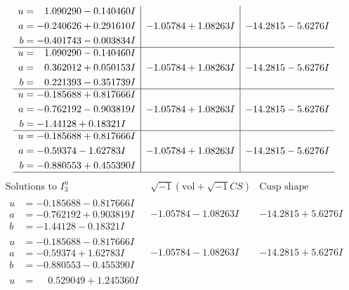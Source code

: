 \documentclass[1p]{elsarticle_modified}
\theoremstyle{definition}
\newcommand{\I}{\sqrt{-1}}
\begin{document}
$$\begin{array}{c|c|c}
\begin{aligned}
u &= \phantom{-}1.090290 - 0.140460 I \\
a &= -0.240626 + 0.291610 I \\
b &= -0.401743 - 0.003834 I\end{aligned}
 & -1.05784 + 1.08263 I & -14.2815 - 5.6276 I \\ \hline\begin{aligned}
u &= \phantom{-}1.090290 - 0.140460 I \\
a &= \phantom{-}0.362012 + 0.050153 I \\
b &= \phantom{-}0.221393 - 0.351739 I\end{aligned}
 & -1.05784 + 1.08263 I & -14.2815 - 5.6276 I \\ \hline\begin{aligned}
u &= -0.185688 + 0.817666 I \\
a &= -0.762192 - 0.903819 I \\
b &= -1.44128 + 0.18321 I\end{aligned}
 & -1.05784 + 1.08263 I & -14.2815 - 5.6276 I \\ \hline\begin{aligned}
u &= -0.185688 + 0.817666 I \\
a &= -0.59374 - 1.62783 I \\
b &= -0.880553 + 0.455390 I\end{aligned}
 & -1.05784 + 1.08263 I & -14.2815 - 5.6276 I\\
 \hline 
 \end{array}$$\newpage$$\begin{array}{c|c|c}  
\text{Solutions to }I^u_{3}& \I (\text{vol} + \sqrt{-1}CS) & \text{Cusp shape}\\
 \hline 
\begin{aligned}
u &= -0.185688 - 0.817666 I \\
a &= -0.762192 + 0.903819 I \\
b &= -1.44128 - 0.18321 I\end{aligned}
 & -1.05784 - 1.08263 I & -14.2815 + 5.6276 I \\ \hline\begin{aligned}
u &= -0.185688 - 0.817666 I \\
a &= -0.59374 + 1.62783 I \\
b &= -0.880553 - 0.455390 I\end{aligned}
 & -1.05784 - 1.08263 I & -14.2815 + 5.6276 I \\ \hline\begin{aligned}
u &= \phantom{-}0.529049 + 1.245360 I \\

\end{aligned}
\end{array}$$
\end{document}
